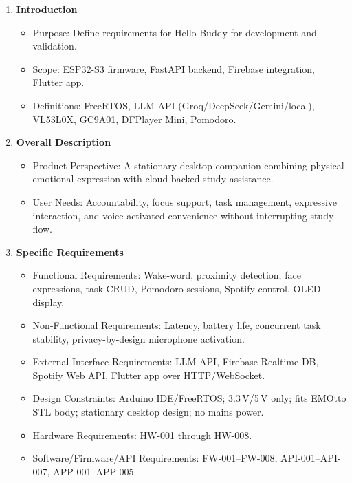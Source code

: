 \documentclass[12pt,a4paper]{article}
\begin{document}
\begin{enumerate}[leftmargin=*]
\item \textbf{Introduction}
    \begin{itemize}
    \item Purpose: Define requirements for Hello Buddy for development
          and validation.
    \item Scope: ESP32-S3 firmware, FastAPI backend, Firebase integration,
          Flutter app.
    \item Definitions: FreeRTOS, LLM API (Groq/DeepSeek/Gemini/local),
          VL53L0X, GC9A01, DFPlayer Mini, Pomodoro.
    \end{itemize}

\item \textbf{Overall Description}
    \begin{itemize}
    \item Product Perspective: A stationary desktop companion combining
          physical emotional expression with cloud-backed study assistance.
    \item User Needs: Accountability, focus support, task management,
          expressive interaction, and voice-activated convenience without
          interrupting study flow.
    \end{itemize}

\item \textbf{Specific Requirements}
    \begin{itemize}
    \item Functional Requirements: Wake-word, proximity detection, face
          expressions, task CRUD, Pomodoro sessions, Spotify control,
          OLED display.
    \item Non-Functional Requirements: Latency, battery life, concurrent
          task stability, privacy-by-design microphone activation.
    \item External Interface Requirements: LLM API, Firebase Realtime DB,
          Spotify Web API, Flutter app over HTTP/WebSocket.
    \item Design Constraints: Arduino IDE/FreeRTOS; 3.3\,V/5\,V only;
          fits EMOtto STL body; stationary desktop design; no mains power.
    \item Hardware Requirements: HW-001 through HW-008.
    \item Software/Firmware/API Requirements: FW-001--FW-008,
          API-001--API-007, APP-001--APP-005.
    \end{itemize}


\end{enumerate}
\end{document}

